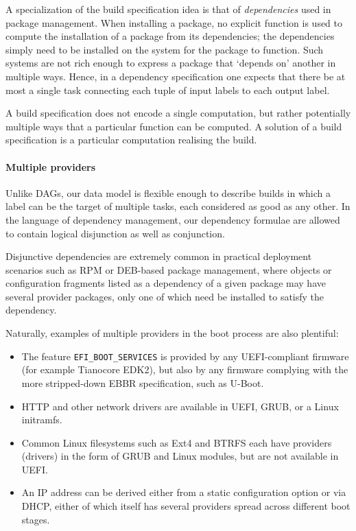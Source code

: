 \begin{example}[Dependencies]

  A specialization of the build specification idea is that of \emph{dependencies} used in package management.
  When installing a package, no explicit function is used to compute the installation of a package from its dependencies; the dependencies simply need to be installed on the system for the package to function.
  Such systems are not rich enough to express a package that `depends on' another in multiple ways.
  Hence, in a dependency specification one expects that there be at most a single task connecting each tuple of input labels to each output label.

\end{example}

\begin{example} 
  
  A build specification does not encode a single computation, but rather potentially multiple ways that a particular function can be computed.
  A solution of a build specification is a particular computation realising the build.

\end{example}

\paragraph{Multiple providers}
%
Unlike DAGs, our data model is flexible enough to describe builds in which a label can be the target of multiple tasks, each considered as good as any other.
%
In the language of dependency management, our dependency formulae are allowed to contain logical disjunction as well as conjunction.

Disjunctive dependencies are extremely common in practical deployment scenarios such as RPM or DEB-based package management, where objects or configuration fragments listed as a dependency of a given package may have several provider packages, only one of which need be installed to satisfy the dependency.

Naturally, examples of multiple providers in the boot process are also plentiful:

\begin{itemize}
  \item
    The feature \texttt{EFI\_BOOT\_SERVICES} is provided by any UEFI-compliant firmware (for example Tianocore EDK2), but also by any firmware complying with the more stripped-down EBBR specification, such as U-Boot.
  \item
    HTTP and other network drivers are available in UEFI, GRUB, or a Linux initramfs.
  \item
    Common Linux filesystems such as Ext4 and BTRFS each have providers (drivers) in the form of GRUB and Linux modules, but are not available in UEFI.
  \item
    An IP address can be derived either from a static configuration option or via DHCP, either of which itself has several providers spread across different boot stages.
\end{itemize}

